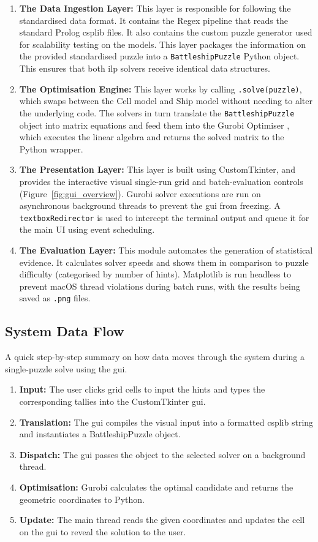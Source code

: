 \begin{enumerate}
    \item \textbf{The Data Ingestion Layer:} This layer is responsible for following the standardised data format. It contains the Regex pipeline that reads the standard Prolog \gls{csplib} files. It also contains the custom puzzle generator used for scalability testing on the models. This layer packages the information on the provided standardised puzzle into a \verb|BattleshipPuzzle| Python object. This ensures that both \gls{ilp} solvers receive identical data structures.
    \item \textbf{The Optimisation Engine:} This layer works by calling \verb|.solve(puzzle)|, which swaps between the Cell model and Ship model without needing to alter the underlying code. The solvers in turn translate the \verb|BattleshipPuzzle| object into matrix equations and feed them into the Gurobi Optimiser \citep{gurobi2024}, which executes the linear algebra and returns the solved matrix to the Python wrapper.
    \item \textbf{The Presentation Layer:} This layer is built using CustomTkinter, and provides the interactive visual single-run grid and batch-evaluation controls (Figure~\ref{fig:gui_overview}). Gurobi solver executions are run on asynchronous background threads to prevent the \gls{gui} from freezing. A \verb|textboxRedirector| is used to intercept the terminal output and queue it for the main UI using event scheduling.
    \item \textbf{The Evaluation Layer:} This module automates the generation of statistical evidence. It calculates solver speeds and shows them in comparison to puzzle difficulty (categorised by number of hints). Matplotlib is run headless to prevent macOS thread violations during batch runs, with the results being saved as \verb|.png| files.
\end{enumerate}

\subsection{System Data Flow}\label{subsec:sys-data-flow}

A quick step-by-step summary on how data moves through the system during a single-puzzle solve using the \gls{gui}.
\begin{enumerate}
    \item \textbf{Input:} The user clicks grid cells to input the hints and types the corresponding tallies into the CustomTkinter \gls{gui}.
    \item \textbf{Translation:} The \gls{gui} compiles the visual input into a formatted \gls{csplib} string and instantiates a BattleshipPuzzle object.
    \item \textbf{Dispatch:} The \gls{gui} passes the object to the selected solver on a background thread.
    \item \textbf{Optimisation:} Gurobi calculates the optimal candidate and returns the geometric coordinates to Python.
    \item \textbf{Update:} The main thread reads the given coordinates and updates the cell on the \gls{gui} to reveal the solution to the user.
\end{enumerate}

